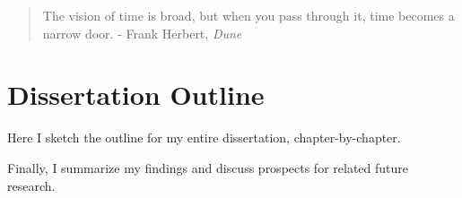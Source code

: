 \begin{quotation}
The vision of time is broad, but when you pass through it, time becomes a narrow door. - Frank Herbert, \textit{Dune}
\end{quotation}

\section{Dissertation Outline}

Here I sketch the outline for my entire dissertation, chapter-by-chapter.

Finally, I summarize my findings and discuss prospects for related future research.

